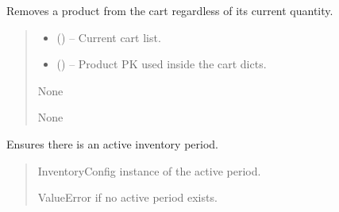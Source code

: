 \documentclass[a4paper,11pt,spanish]{sphinxmanual}
\begin{document}
\begin{fulllineitems}
\label{\detokenize{api/sale/sale.services:sale.services.remove_cart_item}}
\pysigstartsignatures
\pysiglinewithargsret
{}
{\sphinxparamcomma {}}
{}
\pysigstopsignatures
\sphinxAtStartPar
Removes a product from the cart regardless of its current quantity.
\begin{quote}\begin{description}
\begin{itemize}
\item {} 
\sphinxAtStartPar
{} (\sphinxstyleliteralemphasis{\sphinxupquote{{[}}}\sphinxstyleliteralemphasis{\sphinxupquote{{]}}}) – Current cart list.

\item {} 
\sphinxAtStartPar
{} () – Product PK used inside the cart dicts.

\end{itemize}

\sphinxAtStartPar
None

\sphinxAtStartPar
None

\end{description}\end{quote}

\end{fulllineitems}


\begin{fulllineitems}
\label{\detokenize{api/sale/sale.services:sale.services.require_active_period}}
\pysigstartsignatures
\pysiglinewithargsret
{}
{}
{}
\pysigstopsignatures
\sphinxAtStartPar
Ensures there is an active inventory period.
\begin{quote}\begin{description}
\sphinxAtStartPar
InventoryConfig instance of the active period.

\sphinxAtStartPar
ValueError if no active period exists.

\sphinxAtStartPar
{\hyperref[\detokenize{api/inventory/inventory.models:inventory.models.InventoryConfig}]{}}

\end{description}\end{quote}

\end{fulllineitems}
\end{document}
